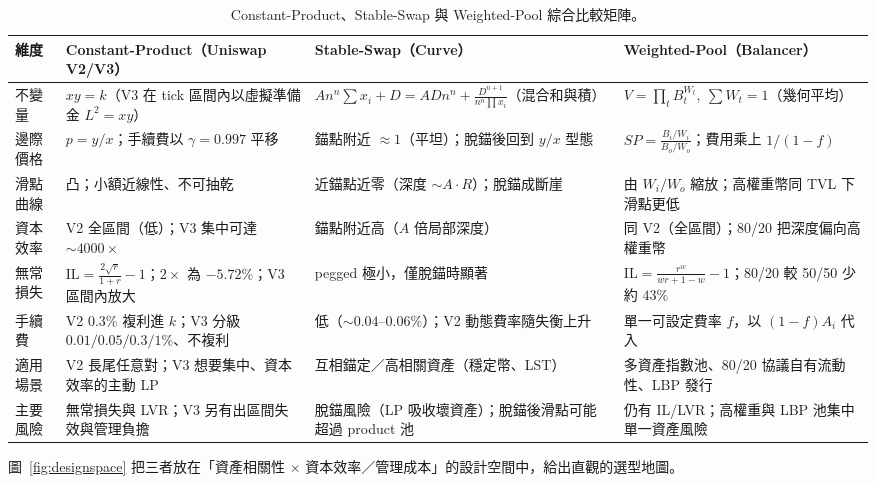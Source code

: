 \documentclass[11pt,a4paper]{article}
\renewcommand{\arraystretch}{1.25}
\newcommand{\IL}{\mathrm{IL}}
\begin{document}
\begin{table}[H]\centering\footnotesize
\caption{Constant-Product、Stable-Swap 與 Weighted-Pool 綜合比較矩陣。}
\label{tab:matrix}
\renewcommand{\arraystretch}{1.35}
\begin{tabularx}{\linewidth}{p{2.3cm} X X X}
\toprule
維度 & \textbf{Constant-Product}（Uniswap V2/V3） & \textbf{Stable-Swap}（Curve） & \textbf{Weighted-Pool}（Balancer）\\
\midrule
不變量 & $xy=k$（V3 在 tick 區間內以虛擬準備金 $L^2=xy$） & $An^n\!\sum x_i+D=ADn^n+\frac{D^{n+1}}{n^n\prod x_i}$（混合和與積） & $V=\prod_t B_t^{W_t},\ \sum W_t=1$（幾何平均）\\
邊際價格 & $p=y/x$；手續費以 $\gamma=0.997$ 平移 & 錨點附近 $\approx 1$（平坦）；脫錨後回到 $y/x$ 型態 & $SP=\frac{B_i/W_i}{B_o/W_o}$；費用乘上 $1/(1-f)$\\
滑點曲線 & 凸；小額近線性、不可抽乾 & 近錨點近零（深度 $\sim A\!\cdot\!R$）；脫錨成斷崖 & 由 $W_i/W_o$ 縮放；高權重幣同 TVL 下滑點更低\\
資本效率 & V2 全區間（低）；V3 集中可達 $\sim4000\times$ & 錨點附近高（$A$ 倍局部深度） & 同 V2（全區間）；80/20 把深度偏向高權重幣\\
無常損失 & $\IL=\frac{2\sqrt r}{1+r}-1$；$2\times$ 為 $-5.72\%$；V3 區間內放大 & pegged 極小，僅脫錨時顯著 & $\IL=\frac{r^w}{wr+1-w}-1$；80/20 較 50/50 少約 $43\%$\\
手續費 & V2 0.3\% 複利進 $k$；V3 分級 $0.01/0.05/0.3/1\%$、不複利 & 低（$\sim0.04$--$0.06\%$）；V2 動態費率隨失衡上升 & 單一可設定費率 $f$，以 $(1-f)A_i$ 代入\\
適用場景 & V2 長尾任意對；V3 想要集中、資本效率的主動 LP & 互相錨定／高相關資產（穩定幣、LST） & 多資產指數池、80/20 協議自有流動性、LBP 發行\\
主要風險 & 無常損失與 LVR；V3 另有出區間失效與管理負擔 & 脫錨風險（LP 吸收壞資產）；脫錨後滑點可能超過 product 池 & 仍有 IL/LVR；高權重與 LBP 池集中單一資產風險\\
\bottomrule
\end{tabularx}
\end{table}

圖~\ref{fig:designspace} 把三者放在「資產相關性 $\times$ 資本效率／管理成本」的設計空間中，給出直觀的選型地圖。
\end{document}
